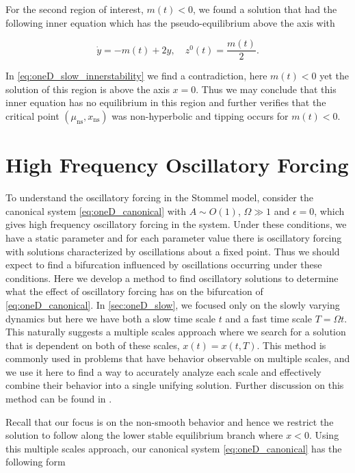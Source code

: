\indent For the second region of interest, $m(t)<0$, we found a solution that had the following inner equation which has the pseudo-equilibrium above the axis with

\begin{equation}\label{eq:oneD_slow_innerstability}
\dot{y}=-m(t)+2y, \quad z^0(t) = \frac{m(t)}{2}.
\end{equation}

In \eqref{eq:oneD_slow_innerstability} we find a contradiction, here $m(t)<0$ yet the solution of this region is above the axis $x=0$. Thus we may conclude that this inner equation has no equilibrium in this region and further verifies that the critical point $(\mu_{\text{ns}},x_{\text{ns}})$ was non-hyperbolic and tipping occurs for $m(t)<0$.

\section{High Frequency Oscillatory Forcing}
\label{sec:oneD_highfreqosc}

To understand the oscillatory forcing in the Stommel model, consider the canonical system \eqref{eq:oneD_canonical} with $A\sim O(1)$, $\Omega\gg 1$ and $\epsilon=0$, which gives high frequency oscillatory forcing in the system. Under these conditions, we have a static parameter and for each parameter value there is oscillatory forcing with solutions characterized by oscillations about a fixed point. Thus we should expect to find a bifurcation influenced by oscillations occurring under these conditions. Here we develop a method to find oscillatory solutions to determine what the effect of oscillatory forcing has on the bifurcation of \eqref{eq:oneD_canonical}. In \autoref{sec:oneD_slow}, we focused only on the slowly varying dynamics but here we have both a slow time scale $t$ and a fast time scale $T=\Omega t$. This naturally suggests a multiple scales approach where we search for a solution that is dependent on both of these scales, $x(t)=x(t,T)$. This method is commonly used in problems that have behavior observable on multiple scales, and we use it here to find a way to accurately analyze each scale and effectively combine their behavior into a single unifying solution. Further discussion on this method can be found in \cite{sanchez1996method}.

\indent Recall that our focus is on the non-smooth behavior and hence we restrict the solution to follow along the lower stable equilibrium branch where $x<0$. Using this multiple scales approach, our canonical system \eqref{eq:oneD_canonical} has the following form

